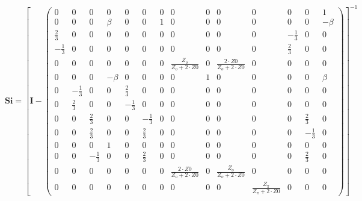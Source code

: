 \[ \mathbf{Si} =  \left[ \mathbf{I}  - \left(\begin{smallmatrix} 0 & 0 & 0 & 0 & 0 & 0 & 0 & 0 & 0 & 0 & 0 & 0 & 0 & 1 \\ 0 & 0 & 0 & \beta & 0 & 0 & 1 & 0 & 0 & 0 & 0 & 0 & 0 & -\beta \\ \frac{2}{3} & 0 & 0 & 0 & 0 & 0 & 0 & 0 & 0 & 0 & 0 & -\frac{1}{3} & 0 & 0 \\ -\frac{1}{3} & 0 & 0 & 0 & 0 & 0 & 0 & 0 & 0 & 0 & 0 & \frac{2}{3} & 0 & 0 \\ 0 & 0 & 0 & 0 & 0 & 0 & 0 & \frac{Z_o}{Z_o+2\cdot Z0} & 0 & \frac{2\cdot Z0}{Z_o+2\cdot Z0} & 0 & 0 & 0 & 0 \\ 0 & 0 & 0 & -\beta & 0 & 0 & 0 & 0 & 1 & 0 & 0 & 0 & 0 & \beta \\ 0 & -\frac{1}{3} & 0 & 0 & \frac{2}{3} & 0 & 0 & 0 & 0 & 0 & 0 & 0 & 0 & 0 \\ 0 & \frac{2}{3} & 0 & 0 & -\frac{1}{3} & 0 & 0 & 0 & 0 & 0 & 0 & 0 & 0 & 0 \\ 0 & 0 & \frac{2}{3} & 0 & 0 & -\frac{1}{3} & 0 & 0 & 0 & 0 & 0 & 0 & \frac{2}{3} & 0 \\ 0 & 0 & \frac{2}{3} & 0 & 0 & \frac{2}{3} & 0 & 0 & 0 & 0 & 0 & 0 & -\frac{1}{3} & 0 \\ 0 & 0 & 0 & 1 & 0 & 0 & 0 & 0 & 0 & 0 & 0 & 0 & 0 & 0 \\ 0 & 0 & -\frac{1}{3} & 0 & 0 & \frac{2}{3} & 0 & 0 & 0 & 0 & 0 & 0 & \frac{2}{3} & 0 \\ 0 & 0 & 0 & 0 & 0 & 0 & 0 & \frac{2\cdot Z0}{Z_o+2\cdot Z0} & 0 & \frac{Z_o}{Z_o+2\cdot Z0} & 0 & 0 & 0 & 0 \\ 0 & 0 & 0 & 0 & 0 & 0 & 0 & 0 & 0 & 0 & \frac{Z_{\pi}}{Z_{\pi}+2\cdot Z0} & 0 & 0 & 0 \end{smallmatrix}\right) \right]^{-1}  \]
